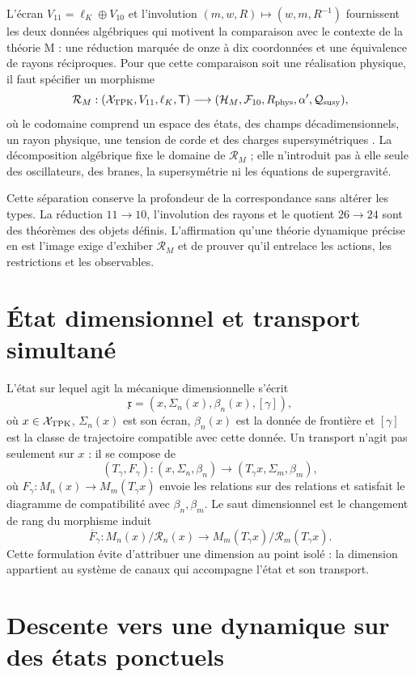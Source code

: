 L'écran \(V_{11}=\ell_K\oplus V_{10}\) et l'involution
\((m,w,R)\mapsto(w,m,R^{-1})\) fournissent les deux données algébriques qui
motivent la comparaison avec le contexte de la théorie M : une réduction marquée
de onze à dix coordonnées et une équivalence de rayons réciproques. Pour que
cette comparaison soit une réalisation physique, il faut spécifier un morphisme
\[
 \mathcal R_M:
 (\mathcal X_{\rm TPK},V_{11},\ell_K,\mathsf T)
 \longrightarrow
 (\mathcal H_M,\mathcal F_{10},R_{\rm phys},\alpha',
 \mathcal Q_{\rm susy}),
\]
où le codomaine comprend un espace des états, des champs
décadimensionnels, un rayon physique, une tension de corde et des charges supersymétriques
\cite{Witten1995}. La décomposition algébrique fixe le domaine de
\(\mathcal R_M\) ; elle n'introduit pas à elle seule des oscillateurs, des branes,
la supersymétrie ni les équations de supergravité.

Cette séparation conserve la profondeur de la correspondance sans altérer
les types. La réduction \(11\to10\), l'involution des rayons et le quotient
\(26\to24\) sont des théorèmes des objets définis. L'affirmation qu'une
théorie dynamique précise en est l'image exige d'exhiber \(\mathcal R_M\) et de prouver
qu'il entrelace les actions, les restrictions et les observables.

\section{État dimensionnel et transport simultané}

L'état sur lequel agit la mécanique dimensionnelle s'écrit
\[
 \mathfrak x=(x,\Sigma_n(x),\beta_n(x),[\gamma]),
\]
où \(x\in\mathcal X_{\rm TPK}\), \(\Sigma_n(x)\) est son écran,
\(\beta_n(x)\) est la donnée de frontière et \([\gamma]\) est la classe de trajectoire
compatible avec cette donnée. Un transport n'agit pas seulement sur \(x\) : il se compose de
\[
 (T_\gamma,F_\gamma):
 (x,\Sigma_n,\beta_n)\longrightarrow
 (T_\gamma x,\Sigma_m,\beta_m),
\]
où \(F_\gamma:M_n(x)\to M_m(T_\gamma x)\) envoie les relations sur des relations
et satisfait le diagramme de compatibilité avec \(\beta_n,\beta_m\). Le saut
dimensionnel est le changement de rang du morphisme induit
\[
 \overline F_\gamma:
 M_n(x)/\mathcal R_n(x)\longrightarrow
 M_m(T_\gamma x)/\mathcal R_m(T_\gamma x).
\]
Cette formulation évite d'attribuer une dimension au point isolé : la dimension
appartient au système de canaux qui accompagne l'état et son transport.

\section{Descente vers une dynamique sur des états ponctuels}

